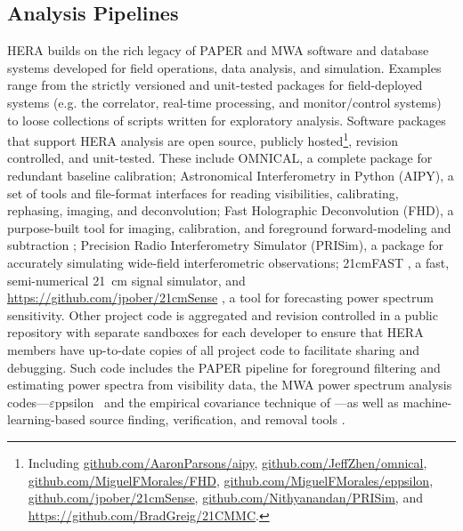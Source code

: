 \documentclass[preprint,11pt]{aastex}
\def\eppsilon{{$\varepsilon$ppsilon}}
\begin{document}

\subsection{Analysis Pipelines} 
\label{sec:software}

\noindent HERA builds on the rich legacy of PAPER and MWA software and database systems 
developed for field operations, data analysis, and simulation.  Examples range from
the strictly versioned and unit-tested packages for field-deployed systems (e.g. the correlator, real-time processing, and
monitor/control systems) to loose collections of scripts written for exploratory analysis.
Software packages that support HERA analysis are open source, publicly 
hosted\footnote{Including \url{github.com/AaronParsons/aipy}, \url{github.com/JeffZhen/omnical}, 
\url{github.com/MiguelFMorales/FHD}, \url{github.com/MiguelFMorales/eppsilon}, \url{github.com/jpober/21cmSense},
\url{github.com/Nithyanandan/PRISim}, and \url{https://github.com/BradGreig/21CMMC}.}, revision controlled, and unit-tested.  
These include OMNICAL, a complete package for redundant baseline calibration;
Astronomical Interferometry in Python (AIPY), a set of
tools and file-format interfaces for reading visibilities, calibrating,
rephasing, imaging, and deconvolution; Fast Holographic Deconvolution
(FHD), a purpose-built tool for imaging, calibration, and foreground
forward-modeling and subtraction \citep{sullivan_et_al2012}; Precision Radio Interferometry Simulator 
(PRISim), a package for accurately simulating wide-field interferometric observations;
21cmFAST \citep{mesinger_et_al2011}, a fast, semi-numerical 21~cm signal simulator,
and \url{https://github.com/jpober/21cmSense} \citep{pober_et_al2014}, a tool for forecasting power spectrum sensitivity.
Other project code is aggregated and revision
controlled in a public repository with separate sandboxes for each developer to ensure that
HERA members have up-to-date copies of all project code to facilitate sharing and debugging.
Such code includes the PAPER pipeline for foreground filtering and estimating power spectra from
visibility data,
the MWA power spectrum analysis codes---\eppsilon\ \citep{hazelton_et_al2016} and the 
empirical covariance technique of \citet{dillon_et_al2015}---as well as
machine-learning-based source finding, verification, and removal tools \citep{caroll_et_al2016,jacobs_et_al2016,beardsley_et_al2016}. 
\end{document}
